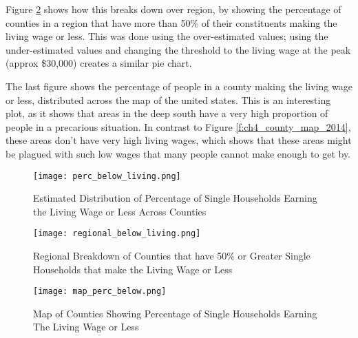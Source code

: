Figure \ref{f:ch5_regional_below_living} shows how this breaks down over region, by showing the percentage of counties in a region that have more than 50\% of their constituents making the living wage or less. This was done using the over-estimated values; using the under-estimated values and changing the threshold to the living wage at the peak (approx \$30,000) creates a similar pie chart.

The last figure shows the percentage of people in a county making the living wage or less, distributed across the map of the united states. This is an interesting plot, as it shows that areas in the deep south have a very high proportion of people in a precarious situation. In contrast to Figure \ref{f:ch4_county_map_2014}, these areas don't have very high living wages, which shows that these areas might be plagued with such low wages that many people cannot make enough to get by.

\begin{figure}[H]
    \centering
        \texttt{[image: perc\_below\_living.png]}
        \caption{Estimated Distribution of Percentage of Single Households Earning the Living Wage or Less Across Counties}
    \label{f:ch5_perc_below_living}
\end{figure}

\begin{figure}[H]
    \centering
        \texttt{[image: regional\_below\_living.png]}
        \caption{Regional Breakdown of Counties that have 50\% or Greater Single Households that make the Living Wage or Less}
    \label{f:ch5_regional_below_living}
\end{figure}

\begin{figure}[H]
\texttt{[image: map\_perc\_below.png]}
    \centering
        \caption{Map of Counties Showing Percentage of Single Households Earning The Living Wage or Less}
    \label{f:ch5_map_perc_below}
\end{figure}
